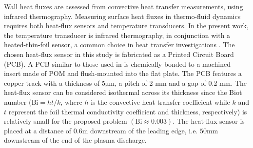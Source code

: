 Wall heat fluxes are assessed from convective heat transfer measurements, using infrared thermography. Measuring surface heat fluxes in thermo-fluid dynamics requires both heat-flux sensors and temperature transducers. In the present work, the temperature transducer is infrared thermography, in conjunction with a heated-thin-foil sensor, a common choice in heat transfer investigations \citep{astarita2012infrared}. The chosen heat-flux sensor in this study is fabricated as a Printed Circuit Board (PCB). A PCB similar to those used in \citet{torre2018HTF} is chemically bonded to a machined insert made of POM and flush-mounted into the flat plate. The PCB features a copper track with a thickness of $5\mathrm{\mu m}$, a pitch of 2 $\mathrm{mm}$ and a gap of 0.2 $\mathrm{mm}$. The heat-flux sensor can be considered isothermal across its thickness \citep{astarita2012infrared} since the Biot number ($\mathrm{Bi} = h t/k$, where $h$ is the convective heat transfer coefficient while $k$ and $t$ represent the foil thermal conductivity coefficient and thickness, respectively) is relatively small for the proposed problem $( \mathrm{Bi} \approx 0.003)$. The heat-flux sensor is placed at a distance of $0.6\mathrm{m}$ downstream of the leading edge, i.e. $50\mathrm{mm}$ downstream of the end of the plasma discharge. 

